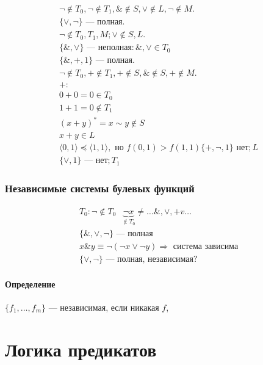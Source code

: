 \documentclass{article}
\begin{document}
\begin{gather*}
    \neg \notin T_0, \neg \notin T_1, \& \notin S, \vee \notin L, \neg \notin M. \\
    \{\vee, \neg\} \text{ --- полная}. \\
    \neg \notin T_0, T_1, M; \vee \notin S, L. \\
    \{\&, \vee\} \text{ --- неполная}: \&, \vee \in T_0 \\
    \{\&, +, 1\} \text{ --- полная}. \\
    \neg \notin T_0, + \notin T_1, + \notin S, \& \notin S, + \notin M. \\
    +: \\
    0 + 0 = 0 \in T_0 \\
    1 + 1 = 0 \notin T_1 \\
    (x + y)^* = x \sim y \notin S \\
    x + y \in L \\
    \langle 0, 1 \rangle \preccurlyeq \langle 1, 1 \rangle, \text{ но } f(0, 1) > f(1, 1)
    \{+, \neg, 1\} \text{ нет}; L \\
    \{\vee, 1\} \text{ --- нет}; T_1
\end{gather*}



\newpage
\section{Независимые системы булевых функций}
\begin{gather*}
    T_0: \neg \notin T_0 ~~~ \underbrace{\neg x}_{\notin T_0} \neq \dots \&, \vee, +v \dots \\
    \{\&, \vee, \neg\} \text{ --- полная} \\
    x \& y \equiv \neg(\neg x \vee \neg y) \Rightarrow \text{ система зависима} \\
    \{\vee, \neg\} \text{ --- полная, независимая?}
\end{gather*}

\subsection{Определение}
$\{f_1, \dots, f_m\}$ --- независимая, если никакая $f$, 



\newpage
\part{Логика предикатов}
\end{document}
